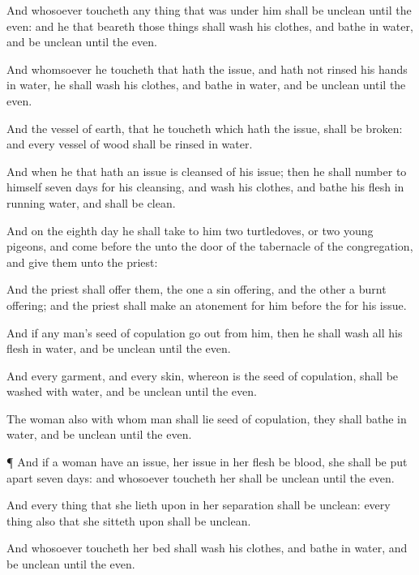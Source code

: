 {And whosoever
toucheth any thing that was under him shall be
unclean until the
even: and he that
beareth
{} those things shall
wash his
clothes, and
bathe
{} in
water, and be
unclean until the
even.

And whomsoever he
toucheth that hath the
issue, and hath not
rinsed his
hands in
water, he shall
wash his
clothes, and
bathe
{} in
water, and be
unclean until the
even.

And the
vessel of
earth, that he
toucheth which hath the
issue, shall be
broken: and every
vessel of
wood shall be
rinsed in
water.

And when he that hath an
issue is
cleansed of his
issue; then he shall
number to himself
seven
days for his
cleansing, and
wash his
clothes, and
bathe his
flesh in
running
water, and shall be
clean.

And on the
eighth
day he shall
take to him
two
turtledoves, or
two
young
pigeons, and
come
before the
{} unto the
door of the
tabernacle of the
congregation, and
give them unto the
priest:

And the
priest shall
offer them, the
one
{} a sin
offering, and the
other
{} a burnt
offering; and the
priest shall make an
atonement for him
before the
{} for his
issue.

And if any
man’s
seed of
copulation go
out from him, then he shall
wash all his
flesh in
water, and be
unclean until the
even.

And every
garment, and every
skin, whereon is the
seed of
copulation, shall be
washed with
water, and be
unclean until the
even.

The
woman also with whom
man shall
lie
{}
seed of
copulation, they shall
{}
bathe
{} in
water, and be
unclean until the
even.


\par }{\PP {}¶ And if a
woman have an
issue,
{} her
issue in her
flesh be
blood, she shall be put
apart
seven
days: and whosoever
toucheth her shall be
unclean until the
even.

And every thing that she
lieth upon in her
separation shall be
unclean: every thing also that she
sitteth upon shall be
unclean.

And whosoever
toucheth her
bed shall
wash his
clothes, and
bathe
{} in
water, and be
unclean until the
even.

}
